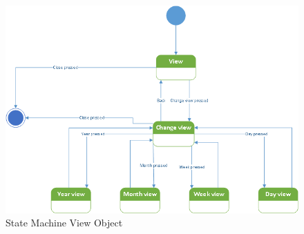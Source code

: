 \begin{figure}[ht!]
\centering
\includegraphics[width=160mm]{view.png}
\caption{State Machine View Object  \label{overflow}}
\end{figure}



